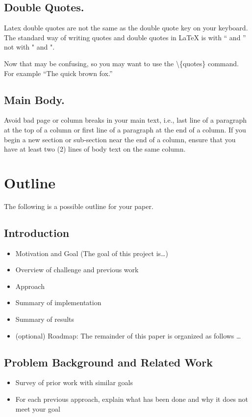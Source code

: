 \documentclass[pageno]{jpaper}
\begin{document}
\subsection{Double Quotes.}

Latex double quotes are not the same as the double quote key on your
keyboard. The standard way of writing quotes and double quotes in
LaTeX is with `` and '' not with " and ".

Now that may be confusing, so you may want to use the \textbackslash\{quotes\} command.  For
example ``The quick brown fox.''



\subsection{Main Body.}

Avoid bad page or column breaks in
your main text, i.e., last line of a paragraph at the top of a
column or first line of a paragraph at the end of a column. If you
begin a new section or sub-section near the end of a column,
ensure that you have at least two (2)  lines of body text on the same
column.

\section{Outline}
The following is a possible outline for your paper.
\subsection{Introduction}
\begin{itemize}
\item Motivation and Goal (The goal of this project is\ldots)
\item Overview of challenge and previous work
\item Approach
\item Summary of implementation
\item Summary of results
\item (optional) Roadmap: The remainder of this paper is organized as follows \ldots
\end{itemize}

\subsection{Problem Background and Related Work}
\begin{itemize}
\item Survey of prior work with similar goals
\item For each previous approach, explain what has been done and why it does not meet your goal
\end{itemize}
\end{document}
